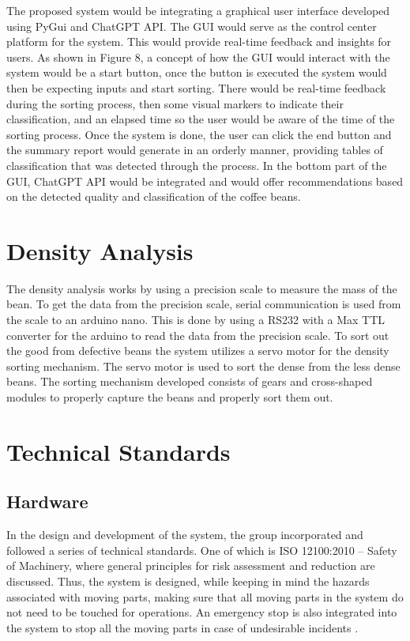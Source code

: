 The proposed system would be integrating a graphical user interface developed using PyGui and ChatGPT API. The GUI would serve as the control center platform for the system. This would provide real-time feedback and insights for users. As shown in Figure 8, a concept of how the GUI would interact with the system would be a start button, once the button is executed the system would then be expecting inputs and start sorting. There would be real-time feedback during the sorting process, then some visual markers to indicate their classification, and an elapsed time so the user would be aware of the time of the sorting process. Once the system is done, the user can click the end button and the summary report would generate in an orderly manner, providing tables of classification that was detected through the process. In the bottom part of the GUI, ChatGPT API would be integrated and would offer recommendations based on the detected quality and classification of the coffee beans. 

\section{Density Analysis}
The density analysis works by using a precision scale to measure the mass of the bean. To get the data from the precision scale, serial communication is used from the scale to an arduino nano. This is done by using a RS232 with a Max TTL converter for the arduino to read the data from the precision scale. To sort out the good from defective beans the system utilizes a servo motor for the density sorting mechanism. The servo motor is used to sort the dense from the less dense beans. The sorting mechanism developed consists of gears and cross-shaped modules to properly capture the beans and properly sort them out. 

\section{Technical Standards}

\subsection{Hardware}
In the design and development of the system, the group incorporated and followed a series of technical standards. One of which is ISO 12100:2010 – Safety of Machinery, where general principles for risk assessment and reduction are discussed. Thus, the system is designed, while keeping in mind the hazards associated with moving parts, making sure that all moving parts in the system do not need to be touched for operations. An emergency stop is also integrated into the system to stop all the moving parts in case of undesirable incidents \cite{International_Organization_for_Standardization_2010}. 

